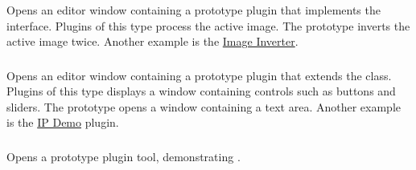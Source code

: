 \subsubsection{\protect{}\label{sub:Plugin-Filter}}

Opens an editor window containing a prototype plugin that implements
the  interface. Plugins of this type process the
active image. The prototype inverts the active image twice. Another
example is the \href{http://imagej.nih.gov/ij/plugins/inverter.html}{Image Inverter}.


\subsubsection{\protect{}\label{sub:Plugin-Frame}}

Opens an editor window containing a prototype plugin that extends
the  class. Plugins of this type displays a window
containing controls such as buttons and sliders. The prototype opens
a window containing a text area. Another example is the \href{http://imagej.nih.gov/ij/plugins/ip-demo.html}{IP Demo}
plugin.


\subsubsection[\protect\userinterface{Plugin Tool}]{\protect{}\label{sub:NewPluginTool}\feature{}}

Opens a prototype plugin tool, demonstrating 
\cite{C-PluginTool}.




\subsubsection{\protect{}\label{sub:Text-Window...}}

